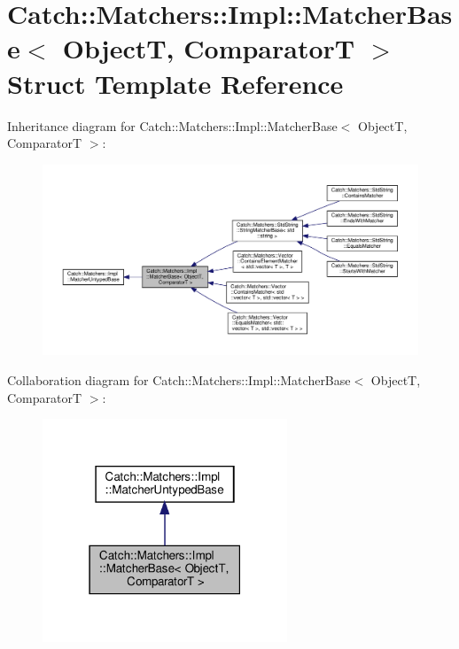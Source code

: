 \hypertarget{structCatch_1_1Matchers_1_1Impl_1_1MatcherBase}{}\section{Catch\+:\+:Matchers\+:\+:Impl\+:\+:Matcher\+Base$<$ ObjectT, ComparatorT $>$ Struct Template Reference}
\label{structCatch_1_1Matchers_1_1Impl_1_1MatcherBase}


Inheritance diagram for Catch\+:\+:Matchers\+:\+:Impl\+:\+:Matcher\+Base$<$ ObjectT, ComparatorT $>$\+:\nopagebreak
\begin{figure}[H]
\begin{center}
\leavevmode
\includegraphics[width=350pt]{structCatch_1_1Matchers_1_1Impl_1_1MatcherBase__inherit__graph}
\end{center}
\end{figure}


Collaboration diagram for Catch\+:\+:Matchers\+:\+:Impl\+:\+:Matcher\+Base$<$ ObjectT, ComparatorT $>$\+:\nopagebreak
\begin{figure}[H]
\begin{center}
\leavevmode
\includegraphics[width=207pt]{structCatch_1_1Matchers_1_1Impl_1_1MatcherBase__coll__graph}
\end{center}
\end{figure}
